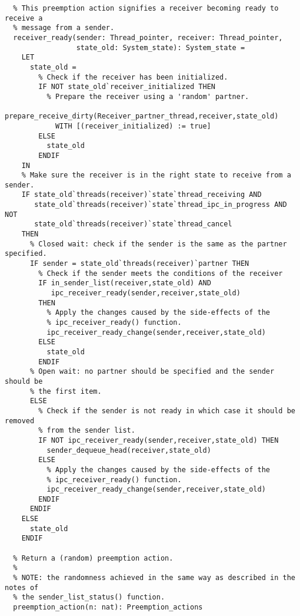 \begin{lstlisting}
  % This preemption action signifies a receiver becoming ready to receive a 
  % message from a sender.
  receiver_ready(sender: Thread_pointer, receiver: Thread_pointer,
                 state_old: System_state): System_state = 
    LET
      state_old = 
        % Check if the receiver has been initialized.
        IF NOT state_old`receiver_initialized THEN 
          % Prepare the receiver using a 'random' partner.
          prepare_receive_dirty(Receiver_partner_thread,receiver,state_old)
            WITH [(receiver_initialized) := true]
        ELSE
          state_old
        ENDIF
    IN
    % Make sure the receiver is in the right state to receive from a sender.
    IF state_old`threads(receiver)`state`thread_receiving AND
       state_old`threads(receiver)`state`thread_ipc_in_progress AND NOT
       state_old`threads(receiver)`state`thread_cancel
    THEN
      % Closed wait: check if the sender is the same as the partner specified.
      IF sender = state_old`threads(receiver)`partner THEN
        % Check if the sender meets the conditions of the receiver
        IF in_sender_list(receiver,state_old) AND 
           ipc_receiver_ready(sender,receiver,state_old)
        THEN
          % Apply the changes caused by the side-effects of the 
          % ipc_receiver_ready() function.
          ipc_receiver_ready_change(sender,receiver,state_old)
        ELSE
          state_old
        ENDIF
      % Open wait: no partner should be specified and the sender should be 
      % the first item.
      ELSE
        % Check if the sender is not ready in which case it should be removed
        % from the sender list.
        IF NOT ipc_receiver_ready(sender,receiver,state_old) THEN
          sender_dequeue_head(receiver,state_old)
        ELSE
          % Apply the changes caused by the side-effects of the
          % ipc_receiver_ready() function.
          ipc_receiver_ready_change(sender,receiver,state_old)
        ENDIF
      ENDIF    
    ELSE
      state_old
    ENDIF

  % Return a (random) preemption action.
  %
  % NOTE: the randomness achieved in the same way as described in the notes of
  % the sender_list_status() function.
  preemption_action(n: nat): Preemption_actions


\end{lstlisting}
